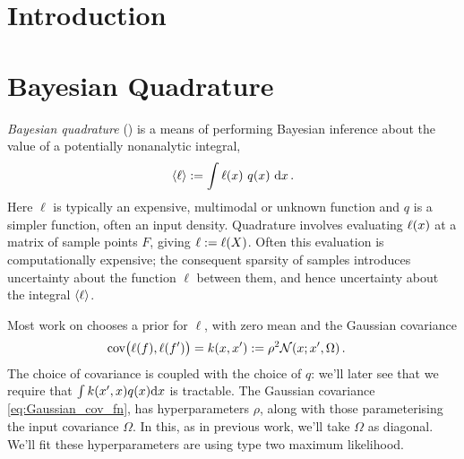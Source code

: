 \documentclass[twoside]{article}
\begin{document}

\begin{abstract}%
\end{abstract}


\section{Introduction}



\section{Bayesian Quadrature} \label{sec:bq}


\emph{Bayesian quadrature} (\bq) \citep{BZHermiteQuadrature,BZMonteCarlo} is a means of performing Bayesian inference about the value of a potentially nonanalytic integral, \begin{equation}\label{eq:bq_integral}
\langle \ell \rangle:= \int \ell(x)~ q(x)~\mathrm{d} x\,.
\end{equation}
Here $\ell$ is typically an expensive, multimodal or unknown function and $q$ is a simpler function, often an input density. 
Quadrature involves evaluating $\ell(x)$ at a matrix of sample points $F$, giving $\ell:= \ell(X)$. Often this evaluation is computationally expensive; the consequent sparsity of samples introduces uncertainty about the function $\ell$ between them, and hence uncertainty about the integral $\langle \ell \rangle$.

Most work on \bq chooses a \gp prior for $\ell$, with zero mean and the Gaussian covariance 
\begin{align} \label{eq:Gaussian_cov_fn}
\text{cov}\bigl(\ell(f),\ell(f')\bigr)=k(x,x') & := \rho^2 \mathcal{N}(x;x',\Omega)\,.
\end{align} 
The choice of covariance is coupled with the choice of $q$: we'll later see that we require that $\int k(x',x) q(x) \mathrm{d}x$ is tractable.
The Gaussian covariance \eqref{eq:Gaussian_cov_fn}, has hyperparameters $\rho$, along with those parameterising the input covariance $\Omega$. In this, as in previous work, we'll take $\Omega$ as diagonal.  We'll fit these hyperparameters are using type two maximum likelihood. 
\end{document}
